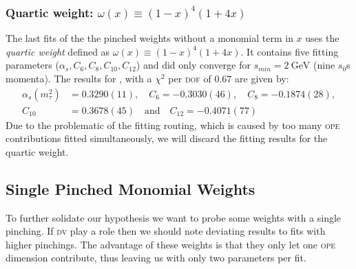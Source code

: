 \documentclass[../../index.tex]{subfiles}
\begin{document}
\subsubsection{Quartic weight: \(\omega(x) \equiv (1-x)^4(1+4x)\)}
\label{sec:quarticWeight}
The last fits of the the pinched weights without a monomial term in \(x\) uses
the \textit{quartic weight} defined as \(\omega(x) \equiv (1-x)^4(1+4x)\). It
contains five fitting parameters (\(\alpha_s, C_6, C_8, C_{10}, C_{12}\)) and
did only converge for \(s_{min}=\SI{2}{\giga\eV}\) (nine \(s_0\)s momenta). The
results for , with a \(\chi^2\) per \textsc{dof} of \(0.67\) are given by:
\begin{equation}
  \begin{split}
    \alpha_s(m_\tau^2) &= 0.3290(11), \quad C_6=-0.3030(46), \quad C_8=-0.1874(28), \\
    C_{10} &= 0.3678(45) \quad \text{and} \quad C_{12}=-0.4071(77)
  \end{split}
\end{equation}
Due to the problematic of the fitting routing, which is caused by too many
\textsc{ope} contributions fitted simultaneously, we will discard the fitting
results for the quartic weight.


\subsection{Single Pinched Monomial Weights}
To further solidate our hypothesis we want to probe some weights with a single
pinching. If \textsc{dv} play a role then we should note deviating results to
fits with higher pinchings. The advantage of these weights is that they only
let one \textsc{ope} dimension contribute, thus leaving us with
only two parameters per fit.
\end{document}
